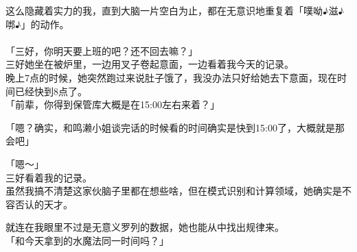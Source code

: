这么隐藏着实力的我，直到大脑一片空白为止，都在无意识地重复着「噗呦♪滋♪𠳐♪」的动作。\\

\sqsplit\\

「三好，你明天要上班的吧？还不回去嘛？」\\

三好她坐在被炉里，一边用叉子卷起意面，一边看着我今天的记录。\\

晚上7点的时候，她突然跑过来说肚子饿了，我没办法只好给她去下意面，现在时间已经快到8点了。\\

「前辈，你得到保管库大概是在15:00左右来着？」

「嗯？确实，和鸣濑小姐谈完话的时候看的时间确实是快到15:00了，大概就是那会吧」

「嗯～」\\

三好看着我的记录。\\

虽然我搞不清楚这家伙脑子里都在想些啥，但在模式识别和计算领域，她确实是不容否认的天才。

就连在我眼里不过是无意义罗列的数据，她也能从中找出规律来。\\

「和今天拿到的水魔法同一时间吗？」

